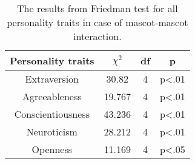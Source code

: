 \begin{table}[H]
    \renewcommand{\arraystretch}{1}
    \begin{center}
        \begin{tabular}{|c|c|c|c|}
            \hline
            \textbf{Personality traits} & \textbf{$\chi^2$} & \textbf{df} & \textbf{p} \\
            \hline
            Extraversion &30.82 &4 &p<.01 \\
            \hline
            Agreeableness &19.767 &4 &p<.01 \\
            \hline
            Conscientiousness & 43.236 &4 &p<.01 \\
            \hline
            Neuroticism &28.212 &4 &p<.01\\
            \hline
            Openness &11.169 &4 &p<.05 \\
            \hline
        \end{tabular}
        \caption{The results from Friedman test for all personality traits in case of mascot-mascot interaction.}
        \label{table:friedmanMM1}
    \end{center}
\end{table}

